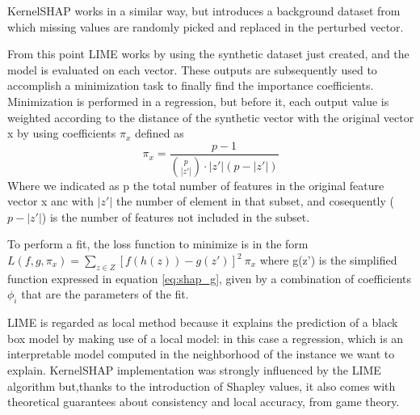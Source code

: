 \documentclass[10pt]{report}
\begin{document}
KernelSHAP works in a similar way, but introduces a background dataset from which missing values are randomly picked and replaced in the perturbed vector.


From this point LIME works by using the synthetic dataset just created, and the model is evaluated on each vector.
These outputs are subsequently used to accomplish a minimization task to finally find the importance coefficients.
Minimization is performed in a regression, but before it, each output value is weighted according to the distance of the synthetic vector with the original vector x by using coefficients $\pi_x$ defined as
\begin{equation}
\pi_x = \frac{p-1}{{p \choose |z'|} \cdot |z'| (p-|z'|)}
\end{equation}
Where we indicated as p the total number of features in the original feature vector x anc with $|z'|$ the number of element in that subset, and cosequently ($p-|z'|$) is the number of features not included in the subset.

To perform a fit, the loss function to minimize is in the form $L(f, g, \pi_x) = \sum_{z\in Z} [f(h(z))-g(z')]^2\ \pi_x$
where g(z') is the simplified function expressed in equation \ref{eq:shap_g}, given by a combination of coefficients $\phi_i$ that are the parameters of the fit.

LIME is regarded as local method because it explains the prediction of a black box model by making use of a local model: in this case a regression, which is an interpretable model computed in the neighborhood of the instance we want to explain.
KernelSHAP implementation was strongly influenced by the LIME algorithm but,thanks to the introduction of Shapley values, it also comes with theoretical guarantees about consistency and local accuracy, from game theory.
\end{document}
